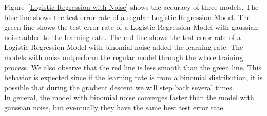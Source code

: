 Figure~\ref{Logistic Regression with Noise} shows the accuracy of
three models.
The blue line shows the test error rate of a regular Logistic Regression
Model. The green line shows the test error rate of a Logistic Regression
Model with gaussian noise added to the learning rate.
The red line shows the test error rate of a Logistic Regression Model
with binomial noise added the learning rate.
The models with noise outperform the regular model through the  whole
training process.
We also observe that the red line is less smooth than the green line.
This behavior is expected since if the learning rate is from a binomial
distribution, it is possible that during the gradient descent we will
step back several times. \\
In general, the model with binomial noise converges faster than the model
with gaussian noise, but eventually they have the same best test error
rate.



